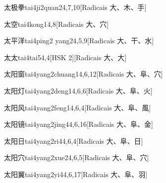 \begin{entry}{太极拳}{tai4ji2quan2}{4,7,10}[Radicais ⼤、⽊、⼿]
\end{entry}

\begin{entry}{太空}{tai4kong1}{4,8}[Radicais ⼤、⽳]
\end{entry}

\begin{entry}{太平洋}{tai4ping2 yang2}{4,5,9}[Radicais ⼤、⼲、⽔]
\end{entry}

\begin{entry}{太太}{tai4tai5}{4,4}[HSK 2][Radicais ⼤、⼤]
\end{entry}

\begin{entry}{太阳窗}{tai4yang2chuang1}{4,6,12}[Radicais ⼤、⾩、⽳]
\end{entry}

\begin{entry}{太阳灯}{tai4yang2deng1}{4,6,6}[Radicais ⼤、⾩、⽕]
\end{entry}

\begin{entry}{太阳风}{tai4yang2feng1}{4,6,4}[Radicais ⼤、⾩、⾵]
\end{entry}

\begin{entry}{太阳镜}{tai4yang2jing4}{4,6,16}[Radicais ⼤、⾩、⾦]
\end{entry}

\begin{entry}{太阳日}{tai4yang2ri4}{4,6,4}[Radicais ⼤、⾩、⽇]
\end{entry}

\begin{entry}{太阳穴}{tai4yang2xue2}{4,6,5}[Radicais ⼤、⾩、⽳]
\end{entry}

\begin{entry}{太阳翼}{tai4yang2yi4}{4,6,17}[Radicais ⼤、⾩、⽻]
\end{entry}

